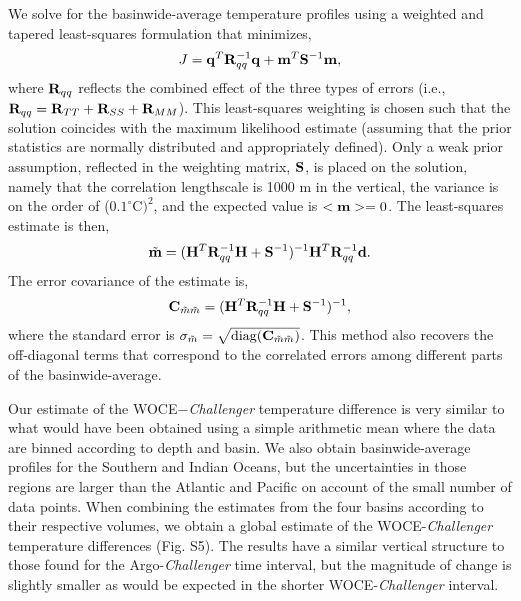 \documentclass[12pt]{article}
\begin{document}
We solve for the basinwide-average temperature profiles using a
weighted and tapered least-squares formulation that minimizes, 
\begin{equation}
\label{eq:qWq}
J = {\bf q}^T {\bf R}_{qq}^{-1} {\bf q} + {\bf m}^T {\bf S}^{-1} {\bf m},
\end{equation}  
where ${\bf R}_{qq}$ reflects the combined effect of the three types of errors (i.e., ${\bf R}_{qq} = {\bf R}_{TT} + {\bf R}_{SS} + {\bf R}_{MM}$). This least-squares weighting %
is chosen such that the solution coincides with the maximum likelihood estimate (assuming that the prior statistics are normally distributed and appropriately defined).
Only a weak prior assumption, reflected in the weighting matrix, ${\bf S}$, is placed on the solution, namely that the correlation lengthscale is 1000 m in the vertical, the variance is on the order of ($0.1^\circ$C$)^2$, and the expected value is $<{\bf m}>=0$.
The least-squares estimate is then,
\begin{equation}
{\tilde {\bf m}} = ({\bf H}^T {\bf R}_{qq}^{-1} {\bf H} + {\bf S}^{-1} )^{-1} {\bf H}^T {\bf R}_{qq}^{-1} {\bf d}.
\end{equation}
 The error covariance of the estimate is,
\begin{equation}
  \label{eq:covariance17}
  \mbox{{\bf C}}_{{\tilde m}{\tilde m}} = ({\bf H}^T {\bf R}_{qq}^{-1} {\bf H} + {\bf S}^{-1} )^{-1},
\end{equation}
where the standard error is
$\sigma_{\tilde m} = \sqrt{\mbox{diag}(\mbox{{\bf C}}_{{\tilde
      m}{\tilde m}})}$.
This method also recovers the off-diagonal terms that correspond to
the correlated errors among different parts of the basinwide-average.

Our estimate of the WOCE$-${\it Challenger} temperature difference is
very similar to what would have been obtained using a simple
arithmetic mean where the data are binned according to depth and basin. We also obtain basinwide-average profiles for the Southern
and Indian Oceans, but the uncertainties in those regions
are larger than the Atlantic and Pacific on account of the small number of data points. When combining the
estimates from the four basins according to their respective volumes,
we obtain a global estimate of the WOCE-{\it Challenger} temperature
differences (Fig. S5). The results have a similar vertical structure to those
found for the Argo-{\it Challenger} time interval, but the magnitude
of change is slightly smaller as would be expected in the shorter
WOCE-{\it Challenger} interval.
\end{document}

